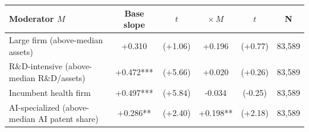 \begin{tabular}{lccccc}
\toprule
Moderator $M$ & Base slope & $t$ & $\times\,M$ & $t$ & N \\
\midrule
Large firm (above-median assets) & +0.310 & (+1.06) & +0.196 & (+0.77) & 83,589 \\
R\&D-intensive (above-median R\&D/assets) & +0.472*** & (+5.66) & +0.020 & (+0.26) & 83,589 \\
Incumbent health firm & +0.497*** & (+5.84) & -0.034 & (-0.25) & 83,589 \\
AI-specialized (above-median AI patent share) & +0.286** & (+2.40) & +0.198** & (+2.18) & 83,589 \\
\bottomrule
\end{tabular}